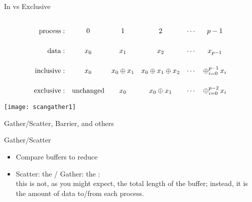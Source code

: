 \begin{numberedframe}{In vs Exclusive}
  \def\strut{\vrule height 25pt width 0pt\relax}
\[
\begin{array}{rccccc}
  \mathrm{process:}\strut
      &0&1&2&\cdots&p-1\\
  \mathrm{data:}\strut
      &x_0&x_1&x_2&\cdots&x_{p-1}\\
  \mathrm{inclusive:}\strut
      &x_0&x_0\oplus x_1&x_0\oplus x_1\oplus x_2&\cdots&\mathop\oplus_{i=0}^{p-1} x_i\\
  \mathrm{exclusive:}\strut
      &\mathrm{unchanged}&x_0&x_0\oplus x_1&\cdots&\mathop\oplus_{i=0}^{p-2} x_i\\
\end{array}
\]
\end{numberedframe}

\begin{mpl}
  \addtocounter{slidecount}{-1}
\end{mpl}


\begin{exerciseframe}[scangather]
  \label{fig:scanints}
  
  \texttt{[image: scangather1]}
\end{exerciseframe}

 {Gather/Scatter, Barrier, and others}

\begin{mpl}
  \addtocounter{slidecount}{-1}
\end{mpl}
\begin{mpl}
  \addtocounter{slidecount}{-1}
\end{mpl}

\begin{numberedframe}{Gather/Scatter}
\begin{itemize}
\item Compare buffers to reduce
\item Scatter: the  / Gather: the :\\
this is not, as you might expect, the total length of the
buffer; instead, it is the amount of data to/from each process.
\end{itemize}
\end{numberedframe}

